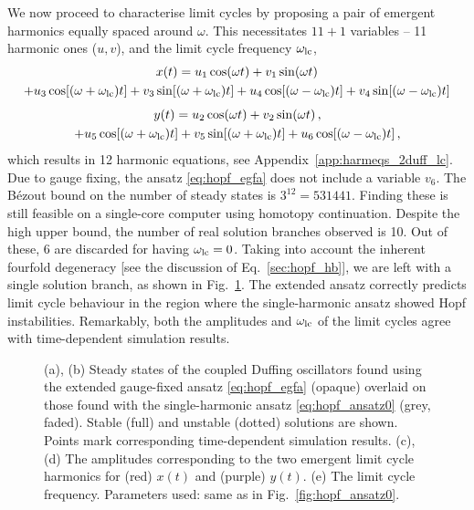 We now proceed to characterise limit cycles by proposing a pair of emergent harmonics equally spaced around $\omega$. This necessitates $11+1$ variables -- 11 harmonic ones ($u, v$), and the limit cycle frequency $\omega_{\rm lc}$,
\begin{multline*}
x(t) = u_1 \cos(\omega t) + v_1 \sin(\omega t) \\
 + u_3 \cos[(\omega + \omega_{\rm lc}) t] + v_3 \sin[(\omega + \omega_{\rm lc}) t] + u_4 \cos[(\omega - \omega_{\rm lc}) t] + v_4 \sin[(\omega - \omega_{\rm lc}) t]
\end{multline*}
\vspace*{-1em}
\begin{multline} \label{eq:hopf_egfa}
y(t) = u_2 \cos(\omega t) + v_2 \sin(\omega t) \,, \\
 + u_5 \cos[(\omega + \omega_{\rm lc}) t] + v_5 \sin[(\omega + \omega_{\rm lc}) t] + u_6 \cos[(\omega - \omega_{\rm lc}) t] \,,
\end{multline}
which results in 12 harmonic equations, see Appendix~\ref{app:harmeqs_2duff_lc}. Due to gauge fixing, the ansatz \eqref{eq:hopf_egfa} does not include a variable $v_6$. The B\'{e}zout bound on the number of steady states is $3^{12} = 531441$. Finding these is still feasible on a single-core computer using homotopy continuation. Despite the high upper bound, the number of real solution branches observed is 10. Out of these, 6 are discarded for having $\omega_{\rm lc} = 0$. Taking into account the inherent fourfold degeneracy [see the discussion of Eq.~\eqref{sec:hopf_hb}], we are left with a single solution branch, as shown in Fig.~\ref{fig:hopf_lc_ss}. The extended ansatz correctly predicts limit cycle behaviour in the region where the single-harmonic ansatz showed Hopf instabilities. Remarkably, both the amplitudes and $\omega_{\rm lc}$ of the limit cycles agree with time-dependent simulation results.

\begin{figure} [h!]
	\centering
	
	\caption{(a), (b) Steady states of the coupled Duffing oscillators found using the extended gauge-fixed ansatz \eqref{eq:hopf_egfa} (opaque) overlaid on those found with the single-harmonic ansatz \eqref{eq:hopf_ansatz0} (grey, faded). Stable (full) and unstable (dotted) solutions are shown. Points mark corresponding time-dependent simulation results. (c),(d) The amplitudes corresponding to the two emergent limit cycle harmonics for (red) $x(t)$ and (purple) $y(t)$. (e) The limit cycle frequency.  Parameters used: same as in Fig.~\ref{fig:hopf_ansatz0}.}
	\label{fig:hopf_lc_ss}
\end{figure}

